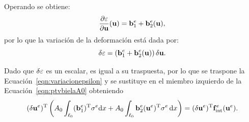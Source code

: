 

Operando se obtiene:
%
\begin{equation} \label{eqn:derivepsilon}
\frac{\partial \varepsilon}{\partial {\bf u} }({\bf u})  =  {\bf b}_1^e + {\bf b}_2^e({\bf u}),
\end{equation}
%
por lo que la variación de la deformación está dada por:
%
\begin{equation}\label{eqn:variacionepsilon}
\delta \varepsilon = \left( {\bf b}_1^e + {\bf b}_2^e({\bf u}) \right) \delta {\bf u}.
\end{equation}



%


Dado que $\delta \varepsilon$ es un escalar, es igual a su traspuesta, por lo que se traspone la Ecuación~\eqref{eqn:variacionepsilon} y se sustituye en el miembro izquierdo de la Ecuación~\eqref{eqn:ptvbielaA0} obteniendo %
%
\begin{equation}
(\delta  {\bf u}^e)^{\text{T}} \left( A_0 \int_{\ell_0}  ({\bf b}_1^e)^{\text{T}} \sigma^e {\text{d}} x + A_0 \int_{\ell_0}  {\bf b}_{2}^e({\bf u}^e)^{\text{T}} \sigma^e  \, {\text{d}} x \right) =
(\delta  {\bf u}^e)^{\text{T}} {\bf f}_{\text{int}}^e({\bf u}^e).
\end{equation}

